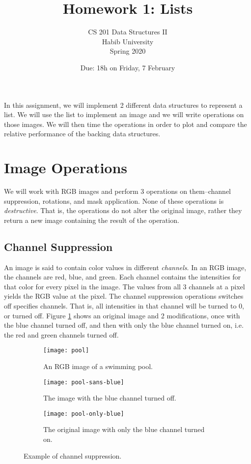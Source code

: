 \documentclass[addpoints]{exam}
\title{Homework 1: Lists}
\author{CS 201 Data Structures II\\Habib University\\Spring 2020}
\date{Due: 18h on Friday, 7 February}
\begin{document}
\maketitle

In this assignment, we will implement 2 different data structures to represent a list. We will use the list to implement an image and we will write operations on those images. We will then time the operations in order to plot and compare the relative performance of the backing data structures.

\section{Image Operations}
\label{sec:imgops}

We will work with RGB images and perform 3 operations on them--channel suppression, rotations, and mask application. None of these operations is \textit{destructive}. That is, the operations do not alter the original image, rather they return a new image containing the result of the operation.

\subsection{Channel Suppression}

An image is said to contain color values in different \textit{channels}. In an RGB image, the channels are red, blue, and green. Each channel contains the intensities for that color for every pixel in the image. The values from all 3 channels at a pixel yields the RGB value at the pixel. The channel suppression operations switches off specifies channels. That is, all intensities in that channel will be turned to 0, or turned off. Figure \ref{fig:channel} shows an original image and 2 modifications, once with the blue channel turned off, and then with only the blue channel turned on, i.e. the red and green channels turned off.

\begin{figure}
  \centering
  \begin{subfigure}{.3\textwidth}
    \texttt{[image: pool]}
    \caption{An RGB image of a swimming pool.}
  \end{subfigure}
  \begin{subfigure}{.3\textwidth}
    \texttt{[image: pool-sans-blue]}
    \caption{The image with the blue channel turned off.}
  \end{subfigure}
  \begin{subfigure}{.3\textwidth}
    \texttt{[image: pool-only-blue]}
    \caption{The original image with only the blue channel turned on.}
  \end{subfigure}
  \caption{Example of channel suppression.}
  \label{fig:channel}
\end{figure}
\end{document}

